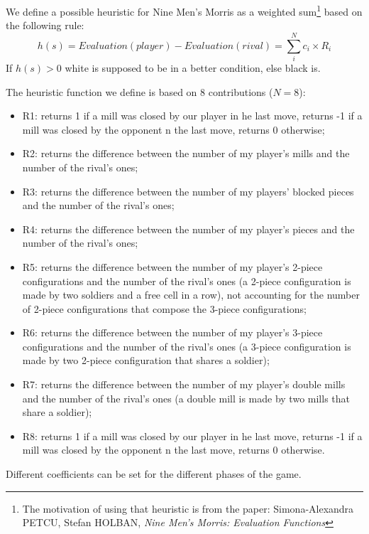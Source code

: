 We define a possible heuristic for Nine Men's Morris as a weighted sum\footnote{The motivation of using that heuristic is from the paper: Simona-Alexandra PETCU, Stefan HOLBAN, \textit{Nine Men's Morris: Evaluation Functions}} based on the following rule:
\begin{equation*}
    h(s) = Evaluation(player)-Evaluation(rival) = \sum_i^N c_i\times R_i
\end{equation*}
If $h(s)>0$ white is supposed to be in a better condition, else black is.

The heuristic function we define is based on 8 contributions ($N=8$):
\begin{itemize}
    \item R1: returns 1 if a mill was closed by our player in he last move, returns -1 if a mill was closed by the opponent n the last move, returns 0 otherwise;
    \item R2: returns the difference between the number of my player's mills and the number of the rival's ones;
    \item R3: returns the difference between the number of my players' blocked pieces and the number of the rival's ones;
    \item R4: returns the difference between the number of my player's pieces and the number of the rival's ones;
    \item R5: returns the difference between the number of my player's 2-piece configurations and the number of the rival's ones (a 2-piece configuration is made by two soldiers and a free cell in a row), not accounting for the number of 2-piece configurations that compose the 3-piece configurations;
    \item R6: returns the difference between the number of my player's 3-piece configurations and the number of the rival's ones (a 3-piece configuration is made by two 2-piece configuration that shares a soldier);
    \item R7: returns the difference between the number of my player's double mills and the number of the rival's ones (a double mill is made by two mills that share a soldier);
    \item R8: returns 1 if a mill was closed by our player in he last move, returns -1 if a mill was closed by the opponent n the last move, returns 0 otherwise.
\end{itemize}
Different coefficients can be set for the different phases of the game.